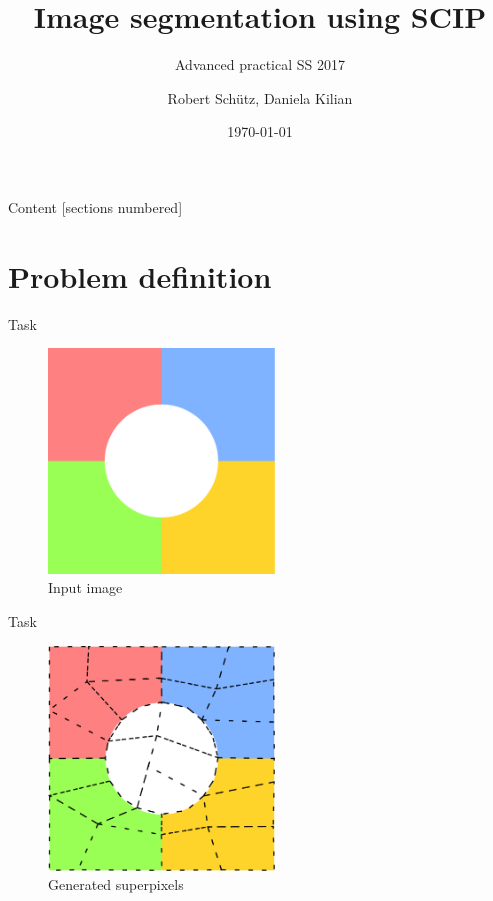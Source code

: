 \documentclass[fleqn]{beamer}
\title{Image segmentation using SCIP}
\date{\today}
\author{Robert Schütz, Daniela Kilian}
\subtitle{Advanced practical SS 2017}
\begin{document}
	\maketitle
	
	\begin{frame}{Content}
		[sections numbered]
		\tableofcontents
	\end{frame}

    \section{Problem definition}
	\begin{frame}{Task}
		\begin{figure}
            \begin{center}
                \includegraphics[width=60mm]{input}
                \caption{Input image}
            \end{center}
		\end{figure}
	\end{frame}

    \begin{frame}{Task}
        \begin{figure}
            \begin{center}
               \includegraphics[width=60mm]{superpixels}
               \caption{Generated superpixels}
           \end{center}
        \end{figure}
    \end{frame}
\end{document}
